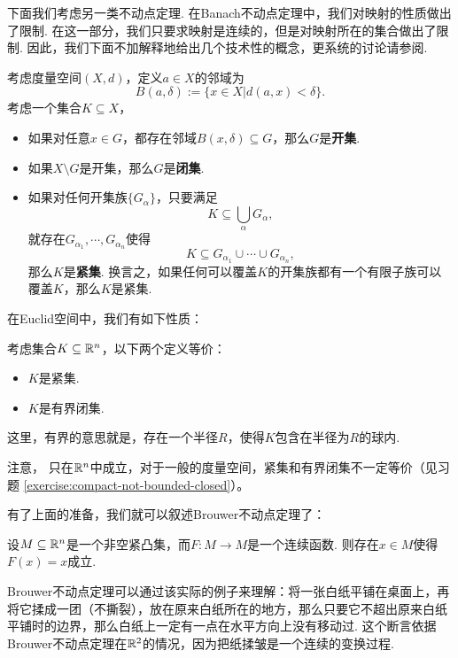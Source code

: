 下面我们考虑另一类不动点定理. 在Banach不动点定理中，我们对映射的性质做出了限制. 在这一部分，我们只要求映射是连续的，但是对映射所在的集合做出了限制. 因此，我们下面不加解释地给出几个技术性的概念，更系统的讨论请参阅.

\begin{definition}[开集、闭集和紧集]
    考虑度量空间$(X,d)$，定义$a\in X$的邻域为
    \[B(a,\delta):=\{x\in X|d(a,x)<\delta\}.\]
    考虑一个集合$K\subseteq X$，
\begin{itemize}
    \item 如果对任意$x\in G$，都存在邻域$B(x,\delta)\subseteq G$，那么$G$是\textbf{开集}.
    \item 如果$X\setminus G$是开集，那么$G$是\textbf{闭集}.
    \item 如果对任何开集族$\{G_\alpha\}$，只要满足
    \[K\subseteq \bigcup_\alpha G_\alpha,\]
    就存在$G_{\alpha_1},\cdots,G_{\alpha_n}$使得
    \[K\subseteq G_{\alpha_1}\cup\cdots\cup G_{\alpha_n},\]
    那么$K$是\textbf{紧集}. 换言之，如果任何可以覆盖$K$的开集族都有一个有限子族可以覆盖$K$，那么$K$是紧集.
\end{itemize}
\end{definition}

在Euclid空间中，我们有如下性质：

\begin{theorem}\label{thm:compact-set-iff-bounded-closed}
    考虑集合$K\subseteq\mathbb{R}^n$，以下两个定义等价：
    \begin{itemize}
        \item $K$是紧集.
        \item $K$是有界闭集.
    \end{itemize}
\end{theorem}
这里，有界的意思就是，存在一个半径$R$，使得$K$包含在半径为$R$的球内. 

注意， 只在$\mathbb{R}^n$中成立，对于一般的度量空间，紧集和有界闭集不一定等价（见习题 \ref{exercise:compact-not-bounded-closed}）。

有了上面的准备，我们就可以叙述Brouwer不动点定理了：

\begin{theorem}[Brouwer不动点定理]
    设$M\subseteq\mathbb{R}^n$是一个非空紧凸集，而$F:M\to M$是一个连续函数. 则存在$x\in M$使得$F(x)=x$成立.
\end{theorem}

Brouwer不动点定理可以通过该实际的例子来理解：将一张白纸平铺在桌面上，再将它揉成一团（不撕裂），放在原来白纸所在的地方，那么只要它不超出原来白纸平铺时的边界，那么白纸上一定有一点在水平方向上没有移动过. 这个断言依据Brouwer不动点定理在$\mathbb{R}^2$的情况，因为把纸揉皱是一个连续的变换过程.

